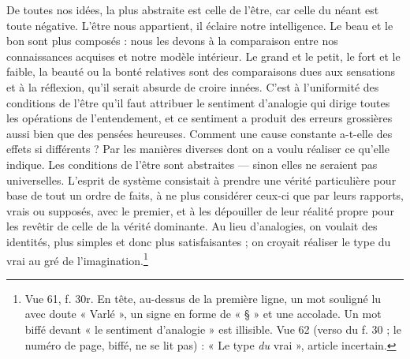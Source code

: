 \documentclass[11pt,a4paper]{article}
\begin{document}
De toutes nos idées, la plus abstraite est celle de l'être, car celle du néant
est toute négative. L'être nous appartient, il éclaire notre intelligence. Le
beau et le bon sont plus composés : nous les devons à la comparaison entre nos
connaissances acquises et notre modèle intérieur. Le grand et le petit, le fort
et le faible, la beauté ou la bonté relatives sont des comparaisons dues aux
sensations et à la réflexion, qu'il serait absurde de croire innées. C'est à
l'uniformité des conditions de l'être qu'il faut attribuer le sentiment
d'analogie qui dirige toutes les opérations de l'entendement, et ce sentiment a
produit des erreurs grossières aussi bien que des pensées heureuses. Comment une
cause constante a-t-elle des effets si différents ? Par les manières diverses
dont on a voulu réaliser ce qu'elle indique. Les conditions de l'être sont
abstraites — sinon elles ne seraient pas universelles. L'esprit de système
consistait à prendre une vérité particulière pour base de tout un ordre de
faits, à ne plus considérer ceux-ci que par leurs rapports, vrais ou supposés,
avec le premier, et à les dépouiller de leur réalité propre pour les revêtir de
celle de la vérité dominante. Au lieu d'analogies, on voulait des identités,
plus simples et donc plus satisfaisantes ; on croyait réaliser le type du vrai
au gré de l'imagination.\footnote{Vue 61, f. 30r. En tête, au-dessus de la
première ligne, un mot souligné lu avec doute « Varlé », un signe en forme de
« § » et une accolade. Un mot biffé devant « le sentiment d'analogie » est
illisible. Vue 62 (verso du f. 30 ; le numéro de page, biffé, ne se lit
pas) : « Le type
\emph{du} vrai », article incertain.}
\end{document}
